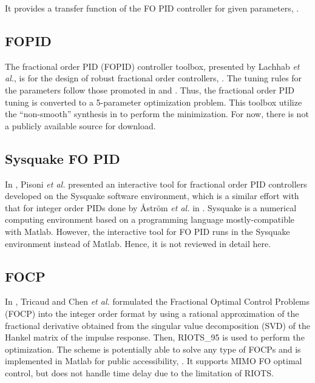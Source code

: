 \documentclass[11pt]{tCON2e}
\theoremstyle{plain}\newtheorem{theorem}{Theorem}
\theoremstyle{definition}
\theoremstyle{remark}
\begin{document}
It provides a transfer function of the FO PID controller for given parameters, \cite{ref:Petras_DFOC}.




\subsection{FOPID}
The fractional order PID (FOPID) controller toolbox, presented by Lachhab \emph{et al.}, is for the design of robust fractional order  controllers, \cite{ref:Nabil_FOPID}. The tuning rules for the parameters follow those promoted in \cite{ref:Luoying1} and \cite{ref:Luoying}. Thus, the fractional order PID tuning is converted to a 5-parameter optimization problem. This toolbox utilize the ``non-smooth''  synthesis in \cite{ref:NonsmoothHinfinity} to perform the minimization. For now, there is not a publicly available source for download.




\subsection{Sysquake FO PID}
In \cite{ref:Sysquake}, Pisoni \emph{et al.} presented an interactive tool for fractional order PID controllers developed on the Sysquake software environment, which is a similar effort with that for integer order PIDs done by {\AA}str\"{o}m \emph{et al.} in \cite{ref:Sysquake_Astrom}. Sysquake is a numerical computing environment based on a programming language mostly-compatible with Matlab. However, the interactive tool for FO PID runs in the Sysquake environment instead of Matlab. Hence, it is not reviewed in detail here.




\subsection{FOCP}
In \cite{ref:FOCP_Tricaud_paper}, Tricaud and Chen \emph{et al.} formulated the Fractional Optimal Control Problems (FOCP) into the integer order format by using a rational
approximation of the fractional derivative obtained from the singular value decomposition (SVD) of the Hankel matrix of the impulse response. Then, RIOTS\_95 \cite{ref:Zhuo_biao, ref:RIOTS_Tricaud_IFAC} is used to perform the optimization. The scheme is potentially able to solve any type of FOCPs and is implemented in Matlab for public accessibility, \cite{ref:FOCP_Tricaud}. It supports MIMO FO optimal control, but does not handle time delay due to the limitation of RIOTS.
\end{document}
